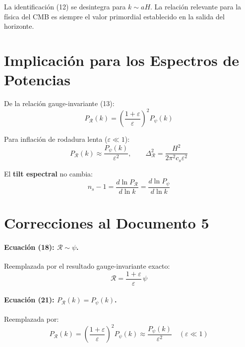 \documentclass[12pt,a4paper]{article}
\begin{document}
La identificación (12) se desintegra para $k \sim aH$. La relación relevante para la física del CMB es siempre el valor primordial establecido en la salida del horizonte.

\section{Implicación para los Espectros de Potencias}

De la relación gauge-invariante (13):
\begin{equation}
P_\mathcal{R}(k) = \left(\frac{1+\varepsilon}{\varepsilon}\right)^2 P_\psi(k) \tag{22}
\end{equation}

Para inflación de rodadura lenta ($\varepsilon \ll 1$):
\begin{equation}
P_\mathcal{R}(k) \approx \frac{P_\psi(k)}{\varepsilon^2}, \qquad \Delta_\mathcal{R}^2 = \frac{H^2}{2\pi^2 c_s \varepsilon^2} \tag{23}
\end{equation}

El \textbf{tilt espectral} no cambia:
\begin{equation}
n_s - 1 = \frac{d\ln P_\mathcal{R}}{d\ln k} = \frac{d\ln P_\psi}{d\ln k} \tag{24}
\end{equation}

\section{Correcciones al Documento 5}

\paragraph{Ecuación (18): $\mathcal{R} \sim \psi$.} Reemplazada por el resultado gauge-invariante exacto:
\begin{equation}
\mathcal{R} = \frac{1+\varepsilon}{\varepsilon}\,\psi \tag{25}
\end{equation}

\paragraph{Ecuación (21): $P_\mathcal{R}(k) = P_\psi(k)$.} Reemplazada por:
\begin{equation}
P_\mathcal{R}(k) = \left(\frac{1+\varepsilon}{\varepsilon}\right)^2 P_\psi(k) \approx \frac{P_\psi(k)}{\varepsilon^2} \quad (\varepsilon \ll 1) \tag{26}
\end{equation}
\end{document}
